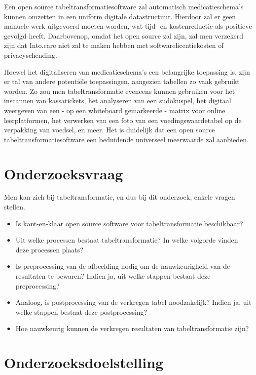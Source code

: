 Een open source tabeltransformatiesoftware zal automatisch medicatieschema’s kunnen omzetten in een uniform digitale datastructuur. Hierdoor zal er geen manuele werk uitgevoerd moeten worden, wat tijd- en kostenreductie als positieve gevolgd heeft. Daarbovenop, omdat het open source zal zijn, zal men verzekerd zijn dat Into.care niet zal te maken hebben met softwarelicentiekosten of privacyschending.


Hoewel het digitaliseren van medicatieschema’s een belangrijke toepassing is, zijn er tal van andere potentiële toepassingen, aangezien tabellen zo vaak gebruikt worden. Zo zou men tabeltransformatie eveneens kunnen gebruiken voor het inscannen van kassatickets, het analyseren van een sudokuspel, het digitaal weergeven van een - op een whiteboard gemarkeerde - matrix voor online leerplatformen, het verwerken van een foto van een voedingswaardetabel op de verpakking van voedsel, en meer. Het is duidelijk dat een open source tabeltransformatiesoftware een beduidende universeel meerwaarde zal aanbieden.


\section{Onderzoeksvraag}
\label{sec:onderzoeksvraag}

Men kan zich bij tabeltransformatie, en dus bij dit onderzoek, enkele vragen stellen.

\begin{itemize}
    \item Is kant-en-klaar open source software voor tabeltransformatie beschikbaar?
    \item Uit welke processen bestaat tabeltransformatie? In welke volgorde vinden deze processen plaats?
    \item Is preprocessing van de afbeelding nodig om de nauwkeurigheid van de resultaten te bewaren? Indien ja, uit welke stappen bestaat deze preprocessing?
    \item Analoog, is postprocessing van de verkregen tabel noodzakelijk? Indien ja, uit welke stappen bestaat deze postprocessing?
    \item Hoe nauwkeurig kunnen de verkregen resultaten van tabeltransformatie zijn?
\end{itemize}

\section{Onderzoeksdoelstelling}
\label{sec:onderzoeksdoelstelling}

